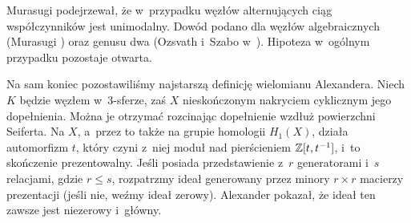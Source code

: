 Murasugi podejrzewał, że w~przypadku węzłów alternujących ciąg współczynników jest unimodalny.
Dowód podano dla węzłów algebraicznych (Murasugi \cite{murasugi85}) oraz genusu dwa (Ozsvath i~Szabo w~\cite{ozsvath03}).
Hipoteza w~ogólnym przypadku pozostaje otwarta.


Na sam koniec pozostawiliśmy najstarszą definicję wielomianu Alexandera.
Niech $K$ będzie węzłem w~3-sferze, zaś $X$ nieskończonym nakryciem cyklicznym jego dopełnienia.
Można je otrzymać rozcinając dopełnienie wzdłuż powierzchni Seiferta.
Na $X$, a~przez to także na grupie homologii $H_1(X)$, działa automorfizm $t$, który czyni z~niej moduł nad pierścieniem $\mathbb Z[t, t^{-1}]$, i~to skończenie prezentowalny.
Jeśli posiada przedstawienie z~$r$ generatorami i~$s$ relacjami, gdzie $r \le s$, rozpatrzmy ideał generowany przez minory $r \times r$ macierzy prezentacji (jeśli nie, weźmy ideał zerowy).
Alexander pokazał, że ideał ten zawsze jest niezerowy i~główny.

